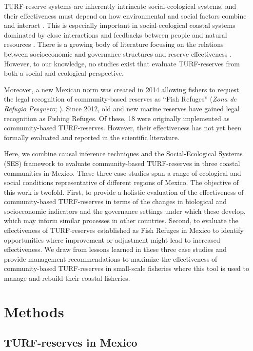 \documentclass{frontiersSCNS}
\begin{document}
TURF-reserve systems are inherently intrincate social-ecological
systems, and their effectiveness must depend on how environmental and
social factors combine and interact \citep{gelcich_2015}. This is
especially important in social-ecological coastal systems dominated by
close interactions and feedbacks between people and natural resources
\citep{ostrom_2009}. There is a growing body of literature focusing on
the relations between socioeconomic and governance structures and
reserve effectiveness
\citep{halpern_2013,lpezangarita_2014,mascia_2017-m_,bergseth_2018}.
However, to our knowledge, no studies exist that evaluate TURF-reserves
from both a social and ecological perspective.

Moreover, a new Mexican norm was created in 2014 allowing fishers to
request the legal recognition of community-based reserves as ``Fish
Refuges'' (\emph{Zona de Refugio Pesquero}; \citet{nom}). Since 2012,
old and new marine reserves have gained legal recognition as Fishing
Refuges. Of these, 18 were originally implemented as community-based
TURF-reserves. However, their effectiveness has not yet been formally
evaluated and reported in the scientific literature.

Here, we combine causal inference techniques and the Social-Ecological
Systems (SES) framework to evaluate community-based TURF-reserves in
three coastal communities in Mexico. These three case studies span a
range of ecological and social conditions representative of different
regions of Mexico. The objective of this work is twofold. First, to
provide a holistic evaluation of the effectiveness of community-based
TURF-reserves in terms of the changes in biological and socioeconomic
indicators and the governance settings under which these develop, which
may inform similar processes in other countries. Second, to evaluate the
effectiveness of TURF-reserves established as Fish Refuges in Mexico to
identify opportunities where improvement or adjustment might lead to
increased effectiveness. We draw from lessons learned in these three
case studies and provide management recommendations to maximize the
effectiveness of community-based TURF-reserves in small-scale fisheries
where this tool is used to manage and rebuild their coastal fisheries.

\hypertarget{methods}{%
\section{Methods}\label{methods}}

\hypertarget{turf-reserves-in-mexico}{%
\subsection{TURF-reserves in Mexico}\label{turf-reserves-in-mexico}}
\end{document}
